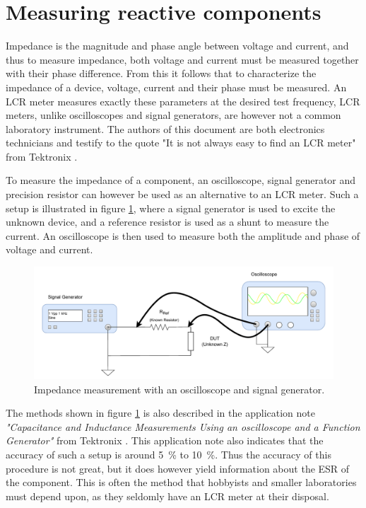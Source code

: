 \section{Measuring reactive components} \label{sec:MeasureReactiveComponents}
Impedance is the magnitude and phase angle between voltage and current, and thus to measure impedance, both voltage and current must be measured together with
their phase difference. From this it follows that to characterize the impedance of a device, voltage, current and their phase must be measured. An LCR meter measures exactly these parameters
at the desired test frequency, LCR meters, unlike oscilloscopes and signal generators, are however not a common laboratory instrument. The authors of this document are both
electronics technicians and testify to the quote "It is not always easy to find an LCR meter" from Tektronix \Cite{TextronixZMeas}. 

To measure the impedance of a component, an oscilloscope, signal generator and precision resistor can however be used as an alternative to an LCR meter. Such a setup is illustrated in figure \ref{fig_2.1_ImpedanceMeas}, where a signal generator is used to excite the unknown device, and a reference resistor is used as a shunt to measure the current. An oscilloscope is then used to measure both the amplitude and phase of voltage and current. 

\begin{figure}[H]
    \centering
    \includegraphics[width=1\textwidth]{Sections/2_ProblemAnalysis/Figures/ScopeGenZMeas.pdf}
    \caption{Impedance measurement with an oscilloscope and signal generator.}
    \label{fig_2.1_ImpedanceMeas}
\end{figure}

The methods shown in figure \ref{fig_2.1_ImpedanceMeas} is also described in the application note \textit{"Capacitance and Inductance Measurements Using an oscilloscope and a Function Generator"} from Tektronix \Cite{TextronixZMeas}. This application note also indicates that the accuracy of such a setup is around \SI{5}{\%} to \SI{10}{\%}. Thus the accuracy of this procedure is not great, but it does however yield information about the ESR of the component. This is often the method that hobbyists and smaller laboratories must depend upon, as they seldomly have an LCR meter at their disposal. 

